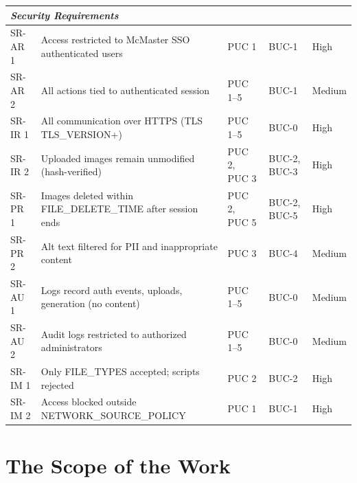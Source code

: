 \documentclass[12pt]{article}
\begin{document}
\begin{longtable}{p{2.2cm}p{5.5cm}p{2.2cm}p{2.0cm}p{1.5cm}}
\multicolumn{5}{l}{\textit{Security Requirements}} \\
\midrule
SR-AR 1  & Access restricted to McMaster SSO authenticated users       & PUC 1              & BUC-1         & High   \\
SR-AR 2  & All actions tied to authenticated session                   & PUC 1--5           & BUC-1         & Medium \\
SR-IR 1  & All communication over HTTPS (TLS TLS\_VERSION+)            & PUC 1--5           & BUC-0         & High   \\
SR-IR 2  & Uploaded images remain unmodified (hash-verified)           & PUC 2, PUC 3       & BUC-2, BUC-3  & High   \\
SR-PR 1  & Images deleted within FILE\_DELETE\_TIME after session ends  & PUC 2, PUC 5       & BUC-2, BUC-5  & High   \\
SR-PR 2  & Alt text filtered for PII and inappropriate content         & PUC 3              & BUC-4         & Medium \\
SR-AU 1  & Logs record auth events, uploads, generation (no content)   & PUC 1--5           & BUC-0         & Medium \\
SR-AU 2  & Audit logs restricted to authorized administrators          & PUC 1--5           & BUC-0         & Medium \\
SR-IM 1  & Only FILE\_TYPES accepted; scripts rejected                  & PUC 2              & BUC-2         & High   \\
SR-IM 2  & Access blocked outside NETWORK\_SOURCE\_POLICY              & PUC 1              & BUC-1         & High   \\
\bottomrule

\end{longtable}
\section{The Scope of the Work}
\end{document}
